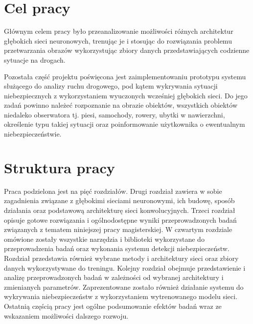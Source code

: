 \section{Cel pracy}
\hspace{0.5cm}
Głównym celem pracy było przeanalizowanie możliwości różnych architektur głębokich sieci neuronowych, trenując je i stosując do rozwiązania problemu przetwarzania obrazów wykorzystując zbiory danych przedstawiających codzienne sytuacje na drogach.

\hspace{0.5cm}
Pozostała część projektu poświęcona jest zaimplementowaniu prototypu systemu służącego do analizy ruchu drogowego, pod kątem wykrywania sytuacji niebezpiecznych z wykorzystaniem wyuczonych wcześniej głębokich sieci. Do jego zadań powinno należeć rozpoznanie na obrazie obiektów, wszystkich obiektów niedaleko obserwatora tj. piesi, samochody, rowery, ubytki w nawierzchni, określenie typu takiej sytuacji oraz poinformowanie użytkownika o ewentualnym niebezpieczeństwie.

\section{Struktura pracy}
\hspace{0.5cm}
Praca podzielona jest na pięć rozdziałów. Drugi rozdział zawiera w sobie zagadnienia związane z głębokimi sieciami neuronowymi, ich budowę, sposób działania oraz podstawową architekturę sieci konwolucyjnych. Trzeci rozdział opisuje gotowe rozwiązania i ogólnodostępne wyniki przeprowadzonych badań związanych z tematem niniejszej
pracy magisterskiej. W czwartym rozdziale omówione zostały wszystkie narzędzia i biblioteki wykorzystane do przeprowadzenia badań oraz wykonania systemu detekcji niebezpieczeństw. Rozdział przedstawia również wybrane metody i architektury sieci oraz zbiory danych wykorzystywane do treningu. Kolejny rozdział obejmuje przedstawienie i analizę przeprowadzonych badań w zależności od wybranej architektury i zmienianych parametrów. Zaprezentowane zostało również działanie systemu do wykrywania niebezpieczeństw z wykorzystaniem wytrenowanego modelu sieci. Ostatnią częścią pracy jest ogólne podsumowanie efektów badań wraz ze wskazaniem możliwości dalszego rozwoju.




